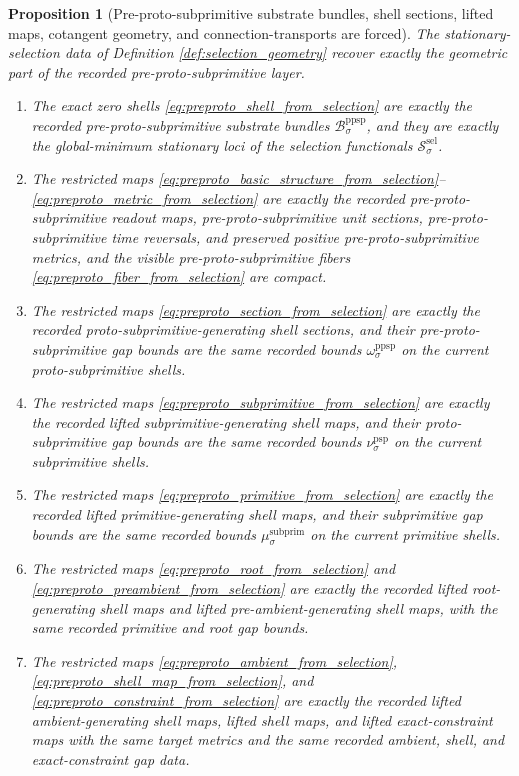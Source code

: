 \documentclass[11pt]{article}
\newcommand{\SubprimGap}[1]{\mu_{#1}^{\mathrm{subprim}}}
\newcommand{\ProtoSubprimGap}[1]{\nu_{#1}^{\mathrm{psp}}}
\newcommand{\PreProtoSubprimGap}[1]{\omega_{#1}^{\mathrm{ppsp}}}
\newcommand{\PreProtoSubprimSpace}[1]{\mathcal B_{#1}^{\mathrm{ppsp}}}
\newcommand{\SelFunctional}[1]{\mathscr S_{#1}^{\mathrm{sel}}}
\newtheorem{proposition}{Proposition}
\begin{document}
\begin{proposition}[Pre-proto-subprimitive substrate bundles, shell sections, lifted maps, cotangent geometry, and connection-transports are forced]
\label{prop:preproto_geometry_forced}
The stationary-selection data of Definition \ref{def:selection_geometry} recover exactly the geometric part of the recorded pre-proto-subprimitive layer.
\begin{enumerate}
    \item The exact zero shells \eqref{eq:preproto_shell_from_selection} are exactly the recorded pre-proto-subprimitive substrate bundles \(\PreProtoSubprimSpace{\sigma}\), and they are exactly the global-minimum stationary loci of the selection functionals \(\SelFunctional{\sigma}\).
    \item The restricted maps \eqref{eq:preproto_basic_structure_from_selection}--\eqref{eq:preproto_metric_from_selection} are exactly the recorded pre-proto-subprimitive readout maps, pre-proto-subprimitive unit sections, pre-proto-subprimitive time reversals, and preserved positive pre-proto-subprimitive metrics, and the visible pre-proto-subprimitive fibers \eqref{eq:preproto_fiber_from_selection} are compact.
    \item The restricted maps \eqref{eq:preproto_section_from_selection} are exactly the recorded proto-subprimitive-generating shell sections, and their pre-proto-subprimitive gap bounds are the same recorded bounds \(\PreProtoSubprimGap{\sigma}\) on the current proto-subprimitive shells.
    \item The restricted maps \eqref{eq:preproto_subprimitive_from_selection} are exactly the recorded lifted subprimitive-generating shell maps, and their proto-subprimitive gap bounds are the same recorded bounds \(\ProtoSubprimGap{\sigma}\) on the current subprimitive shells.
    \item The restricted maps \eqref{eq:preproto_primitive_from_selection} are exactly the recorded lifted primitive-generating shell maps, and their subprimitive gap bounds are the same recorded bounds \(\SubprimGap{\sigma}\) on the current primitive shells.
    \item The restricted maps \eqref{eq:preproto_root_from_selection} and \eqref{eq:preproto_preambient_from_selection} are exactly the recorded lifted root-generating shell maps and lifted pre-ambient-generating shell maps, with the same recorded primitive and root gap bounds.
    \item The restricted maps \eqref{eq:preproto_ambient_from_selection}, \eqref{eq:preproto_shell_map_from_selection}, and \eqref{eq:preproto_constraint_from_selection} are exactly the recorded lifted ambient-generating shell maps, lifted shell maps, and lifted exact-constraint maps with the same target metrics and the same recorded ambient, shell, and exact-constraint gap data.

\end{enumerate}
\end{proposition}
\end{document}
